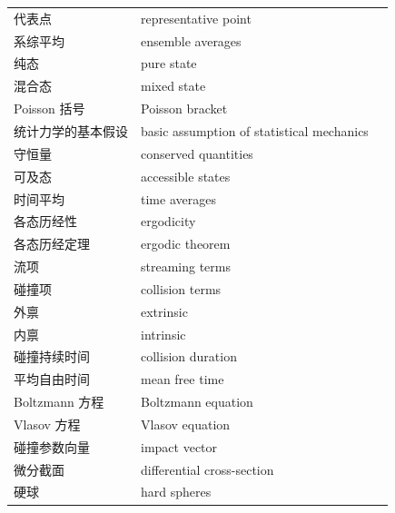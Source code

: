 \begin{xltabular}{\textwidth}{@{}l l c@{}}
  代表点 & {\glossaryfont representative point} & \pageref{term:3.representative-point} \\
  系综平均 & {\glossaryfont ensemble averages} & \pageref{term:3.ensemble-avg} \\
  纯态 & {\glossaryfont pure state} & \pageref{term:3.pure-state} \\
  混合态 & {\glossaryfont mixed state} & \pageref{term:3.mixed-state} \\
  Poisson 括号 & {\glossaryfont Poisson bracket} & \pageref{term:3.poisson-bracket} \\
  统计力学的基本假设 & {\glossaryfont basic assumption of statistical mechanics} & \pageref{term:3.basic-assumption} \\
  守恒量 & {\glossaryfont conserved quantities} & \pageref{term:3.conserved} \\
  可及态 & {\glossaryfont accessible states} & \pageref{term:3.accessible} \\
  时间平均 & {\glossaryfont time averages} & \pageref{term:3.time-avg} \\
  各态历经性 & {\glossaryfont ergodicity} & \pageref{term:3.ergodicity} \\
  各态历经定理 & {\glossaryfont ergodic theorem} & \pageref{term:3.ergodic-theorem} \\
  流项 & {\glossaryfont streaming terms} & \pageref{term:3.streaming} \\
  碰撞项 & {\glossaryfont collision terms} & \pageref{term:3.collision} \\
  外禀 & {\glossaryfont extrinsic} & \pageref{term:3.extrinsic} \\
  内禀 & {\glossaryfont intrinsic} & \pageref{term:3.intrinsic} \\
  碰撞持续时间 & {\glossaryfont collision duration} & \pageref{term:3.collision-duration} \\
  平均自由时间 & {\glossaryfont mean free time} & \pageref{term:3.mean-free-time} \\
  Boltzmann 方程 & {\glossaryfont Boltzmann equation} & \pageref{term:3.boltzmann-equation} \\
  Vlasov 方程 & {\glossaryfont Vlasov equation} & \pageref{term:3.vlasov-equation} \\
  碰撞参数向量 & {\glossaryfont impact vector} & \pageref{term:3.impact-vector} \\
  微分截面 & {\glossaryfont differential cross-section} & \pageref{term:3.differential-cross-section} \\
  硬球 & {\glossaryfont hard spheres} & \pageref{term:3.hard-spheres} \\

\end{xltabular}
